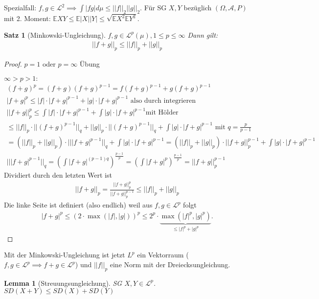 \documentclass[]{article}
\newtheorem{theorem}{Satz}
\newtheorem{lemma}{Lemma}
\begin{document}
Spezialfall: $f,g \in \mathcal{L}^2 \implies \int |fg| d\mu \leq ||f||_2 ||g||_2$.
Für SG $X,Y$ bezüglich $(\Omega, \mathcal{A}, P)$ mit 2. Moment: $\mathbb{E}XY \leq \mathbb{E}|X||Y| \leq \sqrt{\mathbb{E}X^2 \mathbb{E}Y^2}$.

\begin{theorem}[Minkowski-Ungleichung]
	$f,g \in \mathcal{L}^p(\mu), 1 \leq p \leq \infty$ Dann gilt:
	\begin{align*}
		||f+g||_p \leq ||f||_p + ||g||_p
	\end{align*}
\end{theorem}
\begin{proof}
	$p=1$ oder $p=\infty$ Übung
	
	$\infty > p > 1:$
	\begin{align*}
		(f+g)^p = (f+g)(f+g)^{p-1} = f(f+g)^{p-1} + g(f+g)^{p-1}\\
		|f+g|^p \leq |f|\cdot |f+g|^{p-1} + |g|\cdot |f+g|^{p-1} \text{ also durch integrieren}\\
		||f+g||^p_p \leq \int|f|\cdot |f+g|^{p-1} + \int |g|\cdot |f+g|^{p-1} \text{mit Hölder}\\
		\leq ||f||_p \cdot ||(f+g)^{p-1}||_q + ||g||_p \cdot ||(f+g)^{p-1}||_q + \int |g|\cdot |f+g|^{p-1} \text{ mit } q=\frac{p}{p-1}\\
		= (||f||_p + ||g||_p) \cdot || |f+g|^{p-1}||_q + \int |g|\cdot |f+g|^{p-1} = (||f||_p + ||g||_p) \cdot ||f+g||^{p-1}_p + \int |g|\cdot |f+g|^{p-1}\\
		|| |f+g|^{p-1}||_q = \left(\int |f+g|^{(p-1)q}\right)^{\frac{p-1}{p}} = \left(\int |f+g|^p\right)^{\frac{p-1}{p}} = ||f+g||^{p-1}_p
	\end{align*}
	Dividiert durch den letzten Wert ist
	\begin{align*}
		||f+g||_p = \frac{||f+g||_p^p}{||f+g||_p^{p-1}} \leq ||f||_p + ||g||_p
	\end{align*}
	Die linke Seite ist definiert (also endlich) weil aus $f,g \in \mathcal{L}^p$ folgt
	\begin{align*}
		|f+g|^p \leq (2\cdot \max(|f|,|g|))^p \leq 2^p\cdot \underbrace{\max(|f|^p, |g|^p)}_{\leq |f|^p + |g|^p}.
	\end{align*}
\end{proof}

Mit der Minkowski-Ungleichung ist jetzt $L^p$ ein Vektorraum ($f,g \in \mathcal{L}^p \implies f+g\in \mathcal{L}^p$) und $||f||_p$ eine Norm mit der Dreiecksungleichung.

\begin{lemma}[Streuungsungleichung]
	SG $X,Y \in \mathcal{L}^p$. $SD(X+Y) \leq SD(X) + SD(Y)$
\end{lemma}
\end{document}

